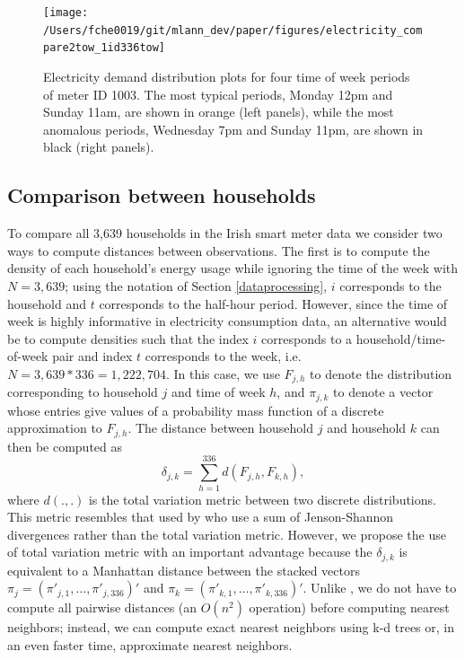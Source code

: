 \documentclass[11pt,a4paper,]{article}
\begin{document}
\begin{figure}

{\centering \texttt{[image: /Users/fche0019/git/mlann\_dev/paper/figures/electricity\_compare2tow\_1id336tow]} 

}

\caption{Electricity demand distribution plots for four time of week periods of meter ID 1003. The most typical periods, Monday 12pm and Sunday 11am, are shown in orange (left panels), while the most anomalous periods, Wednesday 7pm and Sunday 11pm, are shown in black (right panels). }\label{fig:compare2tow}
\end{figure}

\hypertarget{comparison-between-households}{%
\subsection{Comparison between households}\label{comparison-between-households}}

To compare all 3,639 households in the Irish smart meter data we consider two ways to compute distances between observations. The first is to compute the density of each household's energy usage while ignoring the time of the week with \(N=3,639\); using the notation of Section \ref{dataprocessing}, \(i\) corresponds to the household and \(t\) corresponds to the half-hour period. However, since the time of week is highly informative in electricity consumption data, an alternative would be to compute densities such that the index \(i\) corresponds to a household/time-of-week pair and index \(t\) corresponds to the week, i.e.~\(N=3,639*336=1,222,704\). In this case, we use \(F_{j,h}\) to denote the distribution corresponding to household \(j\) and time of week \(h\), and \(\pi_{j,k}\) to denote a vector whose entries give values of a probability mass function of a discrete approximation to \(F_{j,h}\). The distance between household \(j\) and household \(k\) can then be computed as
\begin{equation}\label{eq:betweenhhmetric}
  \delta_{j,k}=\sum\limits_{h=1}^{336}d(F_{j,h},F_{k,h}),
\end{equation}
where \(d(.,.)\) is the total variation metric between two discrete distributions. This metric resembles that used by \textcite{Hyndman2018-ia} who use a sum of Jenson-Shannon divergences rather than the total variation metric. However, we propose the use of total variation metric with an important advantage because the \(\delta_{j,k}\) is equivalent to a Manhattan distance between the stacked vectors \(\pi_j=(\pi'_{j,1},\ldots,\pi'_{j,336})'\) and \(\pi_k=(\pi'_{k,1},\ldots,\pi'_{k,336})'\). Unlike \textcite{Hyndman2018-ia}, we do not have to compute all pairwise distances (an \(O(n^2)\) operation) before computing nearest neighbors; instead, we can compute exact nearest neighbors using k-d trees or, in an even faster time, approximate nearest neighbors.
\end{document}
